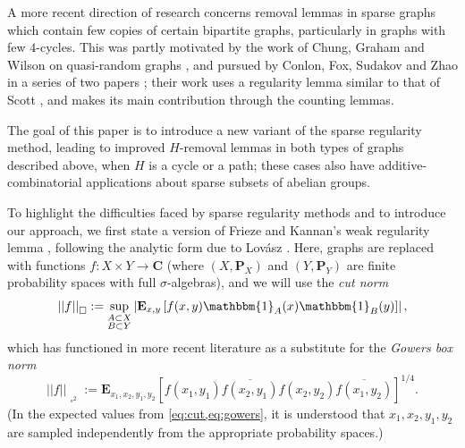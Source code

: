 \documentclass[reqno,11pt]{amsart}
\theoremstyle{definition}
\theoremstyle{remark}
\numberwithin{equation}{section}
\newcommand{\C}{\mathbf{C}}
\renewcommand{\P}{\mathbf{P}}
\newcommand{\E}{\mathbf{E}}
\newcommand{\one}{\mathbbm{1}}
\renewcommand{\bar}{\overline}
\newcommand{\sq}{_{\substack{ \\ \square}}}
\newcommand{\gow}{_{\substack{ \\ \square^2}}}
\begin{document}
A more recent direction of research concerns removal lemmas in sparse graphs which contain few copies of certain bipartite graphs, particularly in graphs with few $4$-cycles. This was partly motivated by the work of Chung, Graham and Wilson on quasi-random graphs \cite{chung1989quasi}, and pursued by Conlon, Fox, Sudakov and Zhao in a series of two papers \cite{conlon2021regularity,conlon2021graphs}; their work uses a regularity lemma similar to that of Scott \cite{scott2011szemeredi}, and makes its main contribution through the counting lemmas.

The goal of this paper is to introduce a new variant of the sparse regularity method, leading to improved $H$-removal lemmas in both types of graphs described above, when $H$ is a cycle or a path; these cases also have additive-combinatorial applications about sparse subsets of abelian groups. %

To highlight the difficulties faced by sparse regularity methods and to introduce our approach, we first state a version of Frieze and Kannan's weak regularity lemma \cite{frieze1999quick}, following the analytic form due to Lov\'asz \cite{lovasz2007szemeredi}. Here, graphs are replaced with functions $f : X \times Y \to \C$ (where $(X, \P_X)$ and $(Y, \P_Y)$ are finite probability spaces with full $\sigma$-algebras), and we will use the \emph{cut norm} \cite{lovasz2012large}
\begin{equation} \label{eq:cut}
    ||f||\sq := \sup_{\substack{A \subset X \\ B \subset Y}} \left\vert \E_{x,y} \left[f(x,y) \one_{A}(x) \one_{B}(y) \right] \right\vert,
\end{equation}
which has functioned in more recent literature  as a substitute for the \emph{Gowers box norm}  \cite{gowers2001new,gowers2007hypergraph}
\begin{equation} \label{eq:gowers}
    ||f||\gow := \E_{x_1,x_2,y_1,y_2}\left[
    f(x_1,y_1)\bar{f(x_2,y_1)}f(x_2,y_2)\bar{f(x_1,y_2)} \right]^{1/4}.
\end{equation}
(In the expected values from \cref{eq:cut,eq:gowers}, it is understood that $x_1, x_2, y_1, y_2$ are sampled independently from the appropriate probability spaces.)
\end{document}
